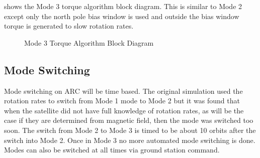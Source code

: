  shows the Mode 3 torque algorithm block diagram. This is similar to Mode 2 except only the north pole bias window is used and outside the bias window torque is generated to slow rotation rates.

\begin{figure}[H]
    \centering
    \caption{Mode 3 Torque Algorithm Block Diagram}
    \label{fig:mode3}
\end{figure}

\subsection{Mode Switching}

Mode switching on \ac{ARC} will be time based. The original simulation used the rotation rates to switch from Mode 1 mode to Mode 2 but it was found that when the satellite did not have full knowledge of rotation rates, as will be the case if they are determined from magnetic field, then the mode was switched too soon. The switch from Mode 2 to Mode 3 is timed to be about 10 orbits after the switch into Mode 2. Once in Mode 3 no more automated mode switching is done. Modes can also be switched at all times via ground station command.

